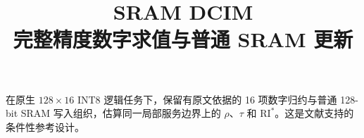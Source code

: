 \documentclass[11pt,a4paper,fontset=fandol]{ctexart}
\title{\bfseries SRAM DCIM\\[4pt]\large 完整精度数字求值与普通 SRAM 更新}
\author{}\date{}
\begin{document}
\maketitle\vspace{-1.7em}
\noindent 在原生 $128\times16$ INT8 逻辑任务下，保留有原文依据的 16 项数字归约与普通 128-bit SRAM 写入组织，估算同一局部服务边界上的 $\rho$、$\tau$ 和 $\mathrm{RI}^{*}$。这是文献支持的条件性参考设计。


\end{document}
